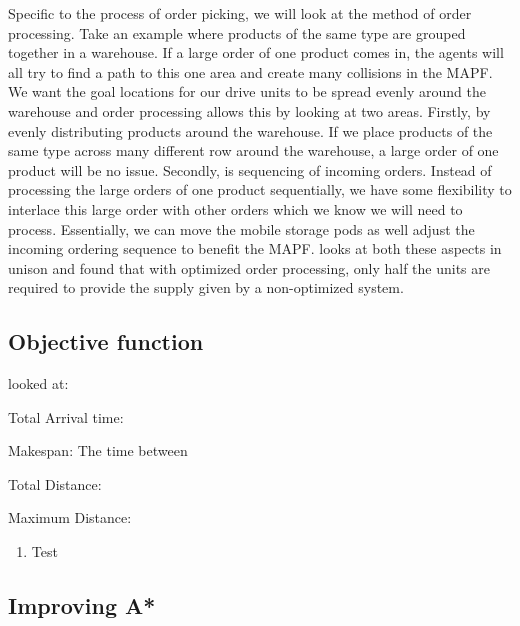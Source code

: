 \documentclass[a4paper,11pt]{article}
\begin{document}
Specific to the process of order picking, we will look at the method of order processing. Take an example where products of the same type are grouped together in a warehouse. If a large order of one product comes in, the agents will all try to find a path to this one area and create many collisions in the MAPF. We want the goal locations for our drive units to be spread evenly around the warehouse and order processing allows this by looking at two areas. Firstly, by evenly distributing products around the warehouse. If we place products of the same type across many different row around the warehouse, a large order of one product will be no issue. Secondly, is sequencing of incoming orders. Instead of processing the large orders of one product sequentially, we have some flexibility to interlace this large order with other orders which we know we will need to process. Essentially, we can move the mobile storage pods as well adjust the incoming ordering sequence to benefit the MAPF. \cite{boysen2017parts} looks at both these aspects in unison and found that with optimized order processing, only half the units are required to provide the supply given by a non-optimized system.

\subsection{Objective function}

\cite{yu2015optimal} looked at: 
\begin{compactenum}
	\item Total Arrival time: 
	\item Makespan: The time between 
	\item Total Distance: 
	\item Maximum Distance: 
\end{compactenum}

\begin{enumerate}
	\item Test
\end{enumerate}



\subsubsection{}

\subsection{Improving A*}
\end{document}
